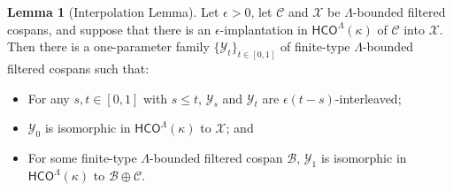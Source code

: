 \documentclass[11pt]{amsart}
\theoremstyle{definition}
\newtheorem{lemma}[theorem]{Lemma}
\theoremstyle{remark}
\numberwithin{equation}{section}
\def\ep{\epsilon}
\begin{document}
\begin{lemma}[Interpolation Lemma] \label{interp}
	Let $\ep>0$, let $\mathcal{C}$ and $\mathcal{X}$ be  $\Lambda$-bounded filtered cospans, and suppose that there is an $\ep$-implantation in $\mathsf{HCO}^{\Lambda}(\kappa)$ of $\mathcal{C}$ into $\mathcal{X}$.  Then there is a one-parameter family $\{\mathcal{Y}_t\}_{t\in [0,1]}$ of finite-type $\Lambda$-bounded filtered cospans such that:
	\begin{itemize}
		\item[(i)] For any $s,t\in [0,1]$ with $s\leq t$, $\mathcal{Y}_s$ and $\mathcal{Y}_t$ are $\ep(t-s)$-interleaved;
		\item[(ii)] $\mathcal{Y}_0$ is isomorphic in $\mathsf{HCO}^{\Lambda}(\kappa)$ to $\mathcal{X}$; and
		\item[(iii)] For some finite-type $\Lambda$-bounded filtered cospan $\mathcal{B}$, $\mathcal{Y}_1$ is isomorphic in $\mathsf{HCO}^{\Lambda}(\kappa)$ to $\mathcal{B}\oplus\mathcal{C}$.
	\end{itemize}
	\end{lemma}
\end{document}
